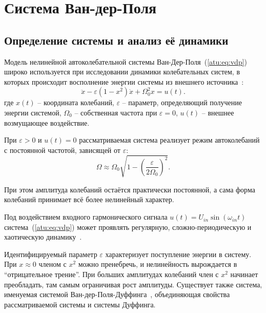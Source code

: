 
\FloatBarrier

\section{Система Ван-дер-Поля} %
\label{atu:sect:vdp}


\subsection{Определение системы и анализ её динамики} %


Модель нелинейной автоколебательной системы Ван-Дер-Поля~(\ref{atu:eq:vdp})
широко используется при исследовании динамики
колебательных систем, в которых происходит восполнение
энергии системы из внешнего источника~\cite{Ginoux2012VanDP,anisch_nonlin_eff,magni_theory_dyn_chaos,atu_asau16,atu_st75,chulichkcov_mm_ml_dyn}:
%
\begin{equation}
 \ddot{x} - \varepsilon (1-x^2)  \dot{x} + \Omega_0^2 x  = u(t) .
\label{atu:eq:vdp}
\end{equation}
\noindent
где
\(x(t)\) -- координата колебаний,
\( \varepsilon \) -- параметр, определяющий получение
  энергии системой,
\( \Omega_0 \) -- собственная частота при \( \varepsilon = 0 \),
\(u(t)\) -- внешнее возмущающее воздействие.

При \( \varepsilon > 0 \) и \( u(t) = 0 \)
рассматриваемая система реализует режим автоколебаний
с постоянной частотой, зависящей от \( \varepsilon \):
%
\begin{equation}
\Omega \approx \Omega_0 \sqrt{ 1 - \left( \frac{\varepsilon}{2 \Omega_0} \right)^2 }.
\label{atu:eq:vdp_Omega}
\end{equation}

При этом амплитуда колебаний остаётся практически постоянной,
а сама форма колебаний принимает всё более нелинейный характер.

Под воздействием входного гармонического сигнала
\( u(t) = U_{in} \sin ( \omega_{in} t ) \)
система~(\ref{atu:eq:vdp}) может проявлять регулярную, сложно-периодическую
и хаотическую динамику~\cite{atu_itcs2011,atu_ISDMCI2011,gang_chaos_on_phase_noise,baranov_chaos_vdp,kuznetsov_phenomen_vdp,math5040070}.

Идентифицируемый параметр \( \varepsilon \)
характеризует поступление энергии в систему.
При $x \approx 0$ членом с $x^2$ можно пренебречь,
и нелинейность вырождается в ``отрицательное трение''.
При больших амплитудах колебаний член с $x^2$
начинает преобладать, там самым ограничивая рост амплитуды.
Существует также система, именуемая системой Ван-дер-Поля-Дуффинга~\cite{landa_nonlin_vivro_waves},
объединяющая свойства рассматриваемой системы и системы Дуффинга.

